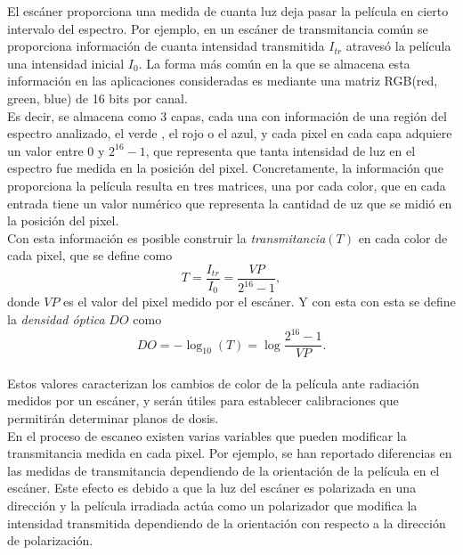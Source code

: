 El escáner proporciona una medida de cuanta luz deja pasar la película en cierto intervalo del espectro. Por ejemplo, en un escáner de transmitancia común  se proporciona información de cuanta intensidad transmitida $I_{tr}$ atravesó la película una intensidad inicial $I_0$. La forma más común en la que se almacena esta información en las aplicaciones consideradas es mediante una matriz RGB(red, green, blue) de 16 bits por canal. \\

Es decir, se almacena como 3 capas, cada una con información de una región del espectro analizado, el verde , el rojo o el azul, y cada pixel en cada capa adquiere un valor entre $0$ y $2^{16}-1$, que representa que tanta intensidad de luz en el espectro fue medida en la posición del pixel. Concretamente, la información que proporciona la película resulta en tres matrices, una por cada color, que en cada entrada tiene un valor numérico que representa la cantidad de uz que se midió en la posición del pixel.\\

Con esta información es posible construir la \textit{transmitancia}$(T)$ en cada color de cada pixel, que se define como 
\begin{equation}
	T=\frac{I_{tr}}{I_0}=\frac{VP}{2^{16}-1},
\end{equation}
donde $VP$ es el valor del pixel medido por el escáner. Y con esta con esta se define la \textit{densidad óptica} $DO$ como 
\begin{equation}
	DO=-\log_{10}(T)=\log \frac{2^{16}-1}{VP}.
\end{equation}\\

Estos valores caracterizan los cambios de color de la película ante radiación medidos por un escáner, y serán útiles para establecer calibraciones que permitirán determinar planos de dosis.\\

En el proceso de escaneo existen varias variables que pueden modificar la transmitancia medida en cada pixel. Por ejemplo, se han reportado diferencias en las medidas de transmitancia dependiendo de la orientación de la película en el escáner\cite{mayers}. Este efecto es debido a que la luz del escáner es polarizada en una dirección y la película irradiada actúa como un polarizador que modifica la intensidad transmitida dependiendo de la orientación con respecto a la dirección de polarización.\\

